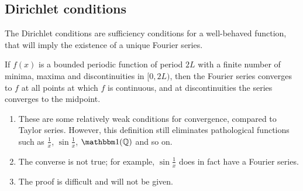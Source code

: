 \subsection{Dirichlet conditions}
The Dirichlet conditions are sufficiency conditions for a well-behaved function, that will imply the existence of a unique Fourier series.
\begin{theorem}
	If \( f(x) \) is a bounded periodic function of period \( 2L \) with a finite number of minima, maxima and discontinuities in \( [0, 2L) \), then the Fourier series converges to \( f \) at all points at which \( f \) is continuous, and at discontinuities the series converges to the midpoint.
\end{theorem}
\begin{remark}
	\begin{enumerate}
		\item These are some relatively weak conditions for convergence, compared to Taylor series.
		      However, this definition still eliminates pathological functions such as \( \frac{1}{x} \), \( \sin \frac{1}{x} \), \( \mathbbm 1 (\mathbb Q) \) and so on.
		\item The converse is not true; for example, \( \sin \frac{1}{x} \) does in fact have a Fourier series.
		\item The proof is difficult and will not be given.
	\end{enumerate}
\end{remark}

